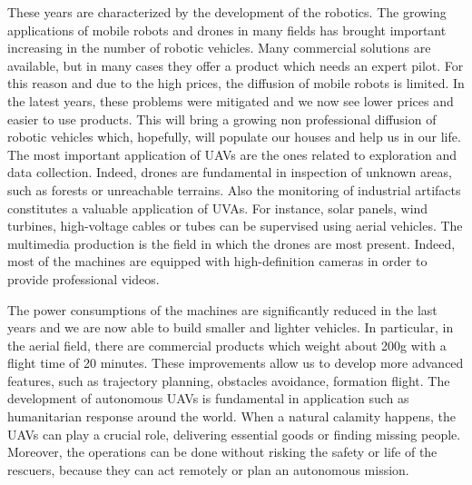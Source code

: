 


These years are characterized by the development of the robotics.
The growing applications of mobile robots and drones in many fields
has brought important increasing in the number of robotic vehicles.
Many commercial solutions are available, but in many cases they offer
a product which needs an expert pilot. For this reason and due to the high prices,
the diffusion of mobile robots is limited. In the latest years, these problems were
mitigated and we now see lower prices and easier to use products. This will bring a
growing non professional diffusion of robotic vehicles which, hopefully, will populate
our houses and help us in our life.
The most important application of UAVs are the ones related to exploration and data
collection. Indeed, drones are fundamental in inspection of unknown areas, such as
forests or unreachable terrains.
Also the monitoring of industrial artifacts constitutes a valuable application of UVAs.
For instance, solar panels, wind turbines, high-voltage cables or tubes can be
supervised using aerial vehicles.
The multimedia production is the field in which the drones are most present. Indeed,
most of the machines are equipped with high-definition cameras in order to provide
professional videos.

The power consumptions of the machines are significantly reduced in the last years
and we are now able to build smaller and lighter vehicles.
In particular, in the aerial field, there are commercial products which weight
about 200g with a flight time of 20 minutes.
These improvements allow us to develop more advanced features, such as
trajectory planning, obstacles avoidance, formation flight.
The development of autonomous UAVs is fundamental in application such as humanitarian
response around the world. When a natural calamity happens, the UAVs can play a
crucial role, delivering essential goods or finding missing people. Moreover, the
operations can be done without risking the safety or life of the rescuers, because
they can act remotely or plan an autonomous mission.

